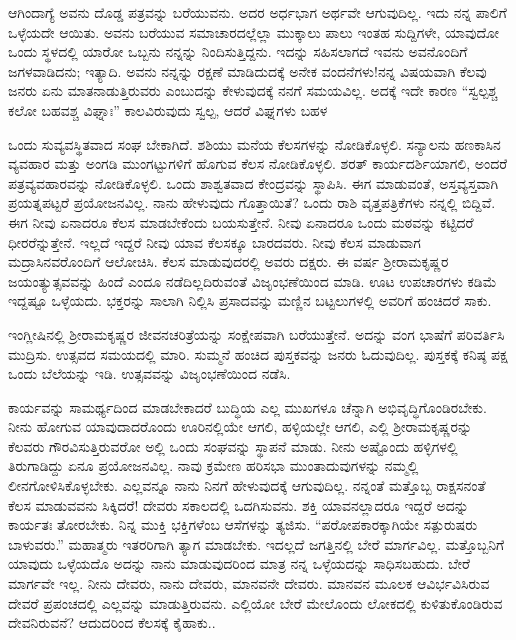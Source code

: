 ಆಗಿಂದಾಗ್ಯೆ\enginline{-} ಅವನು ದೊಡ್ಡ ಪತ್ರವನ್ನು ಬರೆಯುವನು. ಅದರ ಅರ್ಧಭಾಗ ಅರ್ಥವೇ ಆಗುವುದಿಲ್ಲ. ಇದು ನನ್ನ ಪಾಲಿಗೆ ಒಳ್ಳೆಯದೇ ಆಯಿತು. ಅವನು ಬರೆಯುವ ಸಮಾಚಾರದಲ್ಲೆಲ್ಲಾ ಮುಕ್ಕಾಲು ಪಾಲು ಇಂತಹ ಸುದ್ದಿಗಳೇ, ಯಾವುದೋ ಒಂದು ಸ್ಥಳದಲ್ಲಿ ಯಾರೋ ಒಬ್ಬನು ನನ್ನನ್ನು ನಿಂದಿಸುತ್ತಿದ್ದನು. ಇದನ್ನು ಸಹಿಸಲಾಗದೆ ಇವನು ಅವನೊಂದಿಗೆ ಜಗಳವಾಡಿದನು; ಇತ್ಯಾದಿ. ಅವನು ನನ್ನನ್ನು ರಕ್ಷಣೆ ಮಾಡಿದುದಕ್ಕೆ ಅನೇಕ ವಂದನೆಗಳು!ನನ್ನ ವಿಷಯವಾಗಿ ಕೆಲವು ಜನರು ಏನು ಮಾತನಾಡುತ್ತಿರುವರು ಎಂಬುದನ್ನು ಕೇಳುವುದಕ್ಕೆ ನನಗೆ ಸಮಯವಿಲ್ಲ. ಅದಕ್ಕೆ ಇದೇ ಕಾರಣ\enginline{-} “ಸ್ವಲ್ಪಶ್ಚ ಕಲೋ ಬಹವಶ್ಚ ವಿಘ್ನಾಃ” ಕಾಲವಿರುವುದು ಸ್ವಲ್ಪ, ಆದರೆ ವಿಘ್ನಗಳು ಬಹಳ
\vspace{0.1cm}

ಒಂದು ಸುವ್ಯವಸ್ಥಿತವಾದ ಸಂಘ ಬೇಕಾಗಿದೆ. ಶಶಿಯು ಮನೆಯ ಕೆಲಸಗಳನ್ನು ನೋಡಿಕೊಳ್ಳಲಿ. ಸನ್ಯಾಲನು ಹಣಕಾಸಿನ ವ್ಯವಹಾರ ಮತ್ತು ಅಂಗಡಿ ಮುಂಗಟ್ಟುಗಳಿಗೆ ಹೊಗುವ ಕೆಲಸ ನೋಡಿಕೊಳ್ಳಲಿ. ಶರತ್ ಕಾರ್ಯದರ್ಶಿಯಾಗಲಿ, ಅಂದರೆ ಪತ್ರವ್ಯವಹಾರವನ್ನು ನೋಡಿಕೊಳ್ಳಲಿ. ಒಂದು ಶಾಶ್ವತವಾದ ಕೇಂದ್ರವನ್ನು ಸ್ಥಾಪಿಸಿ. ಈಗ ಮಾಡುವಂತೆ, ಅಸ್ತವ್ಯಸ್ತವಾಗಿ ಪ್ರಯತ್ನಪಟ್ಟರೆ ಪ್ರಯೋಜನವಿಲ್ಲ. ನಾನು ಹೇಳುವುದು ಗೊತ್ತಾಯಿತೆ? ಒಂದು ರಾಶಿ ವೃತ್ತಪತ್ರಿಕೆಗಳು ನನ್ನಲ್ಲಿ ಬಿದ್ದಿವೆ. ಈಗ ನೀವು ಏನಾದರೂ ಕೆಲಸ ಮಾಡಬೇಕೆಂದು ಬಯಸುತ್ತೇನೆ. ನೀವು ಏನಾದರೂ ಒಂದು ಮಠವನ್ನು ಕಟ್ಟಿದರೆ ಧೀರರೆನ್ನುತ್ತೇನೆ. ಇಲ್ಲದೆ ಇದ್ದರೆ ನೀವು ಯಾವ ಕೆಲಸಕ್ಕೂ ಬಾರದವರು. ನೀವು ಕೆಲಸ ಮಾಡುವಾಗ ಮದ್ರಾಸಿನವರೊಂದಿಗೆ ಆಲೋಚಿಸಿ. ಕೆಲಸ ಮಾಡುವುದರಲ್ಲಿ ಅವರು ದಕ್ಷರು. ಈ ವರ್ಷ ಶ‍್ರೀರಾಮಕೃಷ್ಣರ ಜಯಂತ್ಯುತ್ಸವವನ್ನು ಹಿಂದೆ ಎಂದೂ ನಡೆದಿಲ್ಲದಿರುವಂತೆ ವಿಜೃಂಭಣೆಯಿಂದ ಮಾಡಿ. ಊಟ ಉಪಚಾರಗಳು ಕಡಿಮೆ ಇದ್ದಷ್ಟೂ ಒಳ್ಳೆಯದು. ಭಕ್ತರನ್ನು ಸಾಲಾಗಿ ನಿಲ್ಲಿಸಿ ಪ್ರಸಾದವನ್ನು ಮಣ್ಣಿನ ಬಟ್ಟಲುಗಳಲ್ಲಿ ಅವರಿಗೆ ಹಂಚಿದರೆ ಸಾಕು.

ಇಂಗ್ಲೀಷಿನಲ್ಲಿ ಶ‍್ರೀರಾಮಕೃಷ್ಣರ ಜೀವನಚರಿತ್ರೆಯನ್ನು ಸಂಕ್ಷೇಪವಾಗಿ ಬರೆಯುತ್ತೇನೆ. ಅದನ್ನು ವಂಗ ಭಾಷೆಗೆ ಪರಿವರ್ತಿಸಿ ಮುದ್ರಿಸು. ಉತ್ಸವದ ಸಮಯದಲ್ಲಿ ಮಾರಿ. ಸುಮ್ಮನೆ ಹಂಚಿದ ಪುಸ್ತಕವನ್ನು ಜನರು ಓದುವುದಿಲ್ಲ. ಪುಸ್ತಕಕ್ಕೆ ಕನಿಷ್ಠ ಪಕ್ಷ ಒಂದು ಬೆಲೆಯನ್ನು ಇಡಿ. ಉತ್ಸವವನ್ನು ವಿಜೃಂಭಣೆಯಿಂದ ನಡೆಸಿ.

ಕಾರ್ಯವನ್ನು ಸಾಮರ್ಥ್ಯದಿಂದ ಮಾಡಬೇಕಾದರೆ ಬುದ್ಧಿಯ ಎಲ್ಲ ಮುಖಗಳೂ ಚೆನ್ನಾಗಿ ಅಭಿವೃದ್ಧಿಗೊಂಡಿರಬೇಕು. ನೀನು ಹೋಗುವ ಯಾವುದಾದರೊಂದು ಊರಿನಲ್ಲಿಯೇ ಆಗಲಿ, ಹಳ್ಳಿಯಲ್ಲೇ ಆಗಲಿ, ಎಲ್ಲಿ ಶ‍್ರೀರಾಮಕೃಷ್ಣರನ್ನು ಕೆಲವರು ಗೌರವಿಸುತ್ತಿರುವರೋ ಅಲ್ಲಿ ಒಂದು ಸಂಘವನ್ನು ಸ್ಥಾಪನೆ ಮಾಡು. ನೀನು ಅಷ್ಟೊಂದು ಹಳ್ಳಿಗಳಲ್ಲಿ ತಿರುಗಾಡಿದ್ದು ಏನೂ ಪ್ರಯೋಜನವಿಲ್ಲ. ನಾವು ಕ್ರಮೇಣ ಹರಿಸಭಾ ಮುಂತಾದುವುಗಳನ್ನು ನಮ್ಮಲ್ಲಿ ಲೀನಗೋಳಿಸಿಕೊಳ್ಳಬೇಕು. ಎಲ್ಲವನ್ನೂ ನಾನು ನಿನಗೆ ಹೇಳುವುದಕ್ಕೆ ಆಗುವುದಿಲ್ಲ. ನನ್ನಂತೆ ಮತ್ತೊಬ್ಬ ರಾಕ್ಷಸನಂತೆ ಕೆಲಸ ಮಾಡುವವನು ಸಿಕ್ಕಿದರೆ! ದೇವರು ಸಕಾಲದಲ್ಲಿ ಒದಗಿಸುವನು. ಶಕ್ತಿ ಯಾವನಲ್ಲಾದರೂ ಇದ್ದರೆ ಅದನ್ನು ಕಾರ್ಯತಃ ತೋರಬೇಕು. ನಿನ್ನ ಮುಕ್ತಿ ಭಕ್ತಿಗಳೆಂಬ ಆಸೆಗಳನ್ನು ತ್ಯಜಿಸು. “ಪರೋಪಕಾರಕ್ಕಾಗಿಯೇ ಸತ್ಪುರುಷರು ಬಾಳುವರು.” ಮಹಾತ್ಮರು ಇತರರಿಗಾಗಿ ತ್ಯಾಗ ಮಾಡಬೇಕು. ಇದಲ್ಲದೆ ಜಗತ್ತಿನಲ್ಲಿ ಬೇರೆ ಮಾರ್ಗವಿಲ್ಲ. ಮತ್ತೊಬ್ಬನಿಗೆ ಯಾವುದು ಒಳ್ಳೆಯದೊ ಅದನ್ನು ನಾನು ಮಾಡುವುದರಿಂದ ಮಾತ್ರ ನನ್ನ ಒಳ್ಳೆಯದನ್ನು ಸಾಧಿಸಬಹುದು. ಬೇರೆ ಮಾರ್ಗವೇ ಇಲ್ಲ. ನೀನು ದೇವರು, ನಾನು ದೇವರು, ಮಾನವನೇ ದೇವರು. ಮಾನವನ ಮೂಲಕ ಆವಿರ್ಭವಿಸಿರುವ ದೇವರೆ ಪ್ರಪಂಚದಲ್ಲಿ ಎಲ್ಲವನ್ನು ಮಾಡುತ್ತಿರುವನು. ಎಲ್ಲಿಯೋ ಬೇರೆ ಮೇಲೊಂದು ಲೋಕದಲ್ಲಿ ಕುಳಿತುಕೊಂಡಿರುವ ದೇವನಿರುವನೆ? ಆದುದರಿಂದ ಕೆಲಸಕ್ಕೆ ಕೈಹಾಕು..

